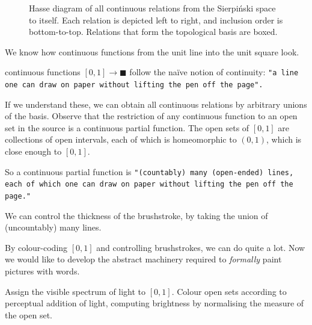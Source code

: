 \documentclass{tufte-handout}
\theoremstyle{definition}
\begin{document}
\begin{figure}\label{fig:hassesierpinski}
\centering
{}
\caption{Hasse diagram of all continuous relations from the Sierpi\'{n}ski space to itself. Each relation is depicted left to right, and inclusion order is bottom-to-top. Relations that form the topological basis are boxed.}
\end{figure}

\clearpage

 We know how continuous functions from the unit line into the unit square look.
\begin{marginfigure}
\centering
{}
\caption{
continuous functions $[0,1] \rightarrow \blacksquare$ follow the na\"{i}ve notion of continuity: \texttt{"a line one can draw on paper without lifting the pen off the page".}
}
\label{fig:contline}
\end{marginfigure}
 If we understand these, we can obtain all continuous relations by arbitrary unions of the basis. Observe that the restriction of any continuous function to an open set in the source is a continuous partial function. The open sets of $[0,1]$ are collections of open intervals, each of which is homeomorphic to $(0,1)$, which is close enough to $[0,1]$.
%
\begin{marginfigure}
\centering
{}
\caption{
So a continuous partial function is \texttt{"(countably) many (open-ended) lines, each of which one can draw on paper without lifting the pen off the page."}
}
\label{fig:contline}
\end{marginfigure}
%
\begin{marginfigure}
\centering
{}
\caption{We can control the thickness of the brushstroke, by taking the union of (uncountably) many lines.}
\label{fig:thickbrush}
\end{marginfigure}

 By colour-coding $[0,1]$ and controlling brushstrokes, we can do quite a lot. Now we would like to develop the abstract machinery required to \emph{formally} paint pictures with words.

\begin{marginfigure}
\centering
{}
\caption{Assign the visible spectrum of light to $[0,1]$. Colour open sets according to perceptual addition of light, computing brightness by normalising the measure of the open set.}
\end{marginfigure}
\end{document}
